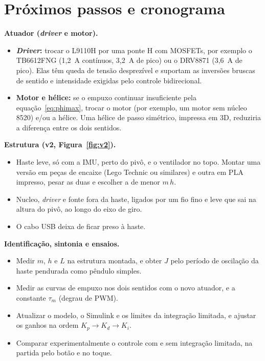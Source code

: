 \documentclass[a4paper,11pt]{article}
\begin{document}
\section{Próximos passos e cronograma}
\label{sec:proximos}

\textbf{Atuador (\textit{driver} e motor).}
\begin{itemize}
  \item \textbf{\textit{Driver}:} trocar o L9110H por uma ponte H com MOSFETs, por exemplo o
    TB6612FNG (1,2~A contínuos, 3,2~A de pico) ou o DRV8871 (3,6~A de pico). Elas têm queda de
    tensão desprezível e suportam as inversões bruscas de sentido e intensidade exigidas pelo
    controle bidirecional.
  \item \textbf{Motor e hélice:} se o empuxo continuar insuficiente pela equação~\eqref{eq:phimax},
    trocar o motor (por exemplo, um motor sem núcleo 8520) e/ou a hélice. Uma hélice de passo
    simétrico, impressa em 3D, reduziria a diferença entre os dois sentidos.
\end{itemize}

\textbf{Estrutura (v2, Figura~\ref{fig:v2}).}
\begin{itemize}
  \item Haste leve, só com a IMU, perto do pivô, e o ventilador no topo. Montar uma versão em peças
    de encaixe (Lego Technic ou similares) e outra em PLA impresso, pesar as duas e escolher a de menor
    $m\,h$.
  \item Nucleo, \textit{driver} e fonte fora da haste, ligados por um fio fino e leve que sai na
    altura do pivô, ao longo do eixo de giro.
  \item O cabo USB deixa de ficar preso à haste.
\end{itemize}

\textbf{Identificação, sintonia e ensaios.}
\begin{itemize}
  \item Medir $m$, $h$ e $L$ na estrutura montada, e obter $J$ pelo período de oscilação da haste
    pendurada como pêndulo simples.
  \item Medir as curvas de empuxo nos dois sentidos com o novo atuador, e a constante $\tau_m$
    (degrau de PWM).
  \item Atualizar o modelo, o Simulink e os limites da integração limitada, e ajustar os ganhos na
    ordem $K_p\rightarrow K_d\rightarrow K_i$.
  \item Comparar experimentalmente o controle com e sem integração limitada, na partida pelo botão
    e no toque.
\end{itemize}
\end{document}
